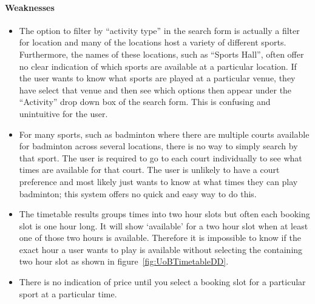 \paragraph{Weaknesses}
\begin{itemize}
	\item The option to filter by ``activity type'' in the search form is
		actually a filter for location and many of the locations host a variety
		of different sports. Furthermore, the names of these locations, such as
		``Sports Hall'', often offer no clear indication of which sports are
		available at a particular location. If the user wants to know what
		sports are played at a particular venue, they have select that venue
		and then see which options then appear under the ``Activity'' drop down
		box of the search form. This is confusing and unintuitive for the user.
	\item For many sports, such as badminton where there are multiple courts
		available for badminton across several locations, there is no way to
		simply search by that sport. The user is required to go to each court
		individually to see what times are available for that court. The user
		is unlikely to have a court preference and most likely just wants to
		know at what times they can play badminton; this system offers no quick
		and easy way to do this.
	\item The timetable results groups times into two hour slots but often each
		booking slot is one hour long. It will show `available' for a two hour
		slot when at least one of those two hours is available. Therefore it is
		impossible to know if the exact hour a user wants to play is available
		without selecting the containing two hour slot as shown in
		figure~\ref{fig:UoBTimetableDD}.

	\item There is no indication of price until you select a booking slot for a
		particular sport at a particular time.
\end{itemize}

